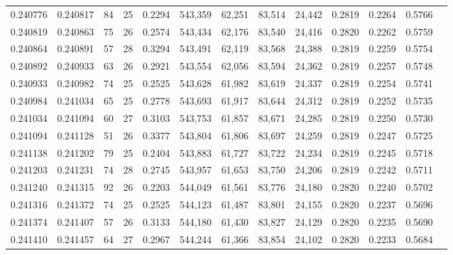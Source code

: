 \begin{tabular}{rrrrrrrrrrrrr}
0.240776 & 0.240817 &  84 &  25 &                                     0.2294 & 543,359 &  62,251 &  83,514 &  24,442 & 0.2819 & 0.2264 & 0.5766 \\
0.240819 & 0.240863 &  75 &  26 &                                     0.2574 & 543,434 &  62,176 &  83,540 &  24,416 & 0.2820 & 0.2262 & 0.5759 \\
0.240864 & 0.240891 &  57 &  28 &                                     0.3294 & 543,491 &  62,119 &  83,568 &  24,388 & 0.2819 & 0.2259 & 0.5754 \\
0.240892 & 0.240933 &  63 &  26 &                                     0.2921 & 543,554 &  62,056 &  83,594 &  24,362 & 0.2819 & 0.2257 & 0.5748 \\
0.240933 & 0.240982 &  74 &  25 &                                     0.2525 & 543,628 &  61,982 &  83,619 &  24,337 & 0.2819 & 0.2254 & 0.5741 \\
0.240984 & 0.241034 &  65 &  25 &                                     0.2778 & 543,693 &  61,917 &  83,644 &  24,312 & 0.2819 & 0.2252 & 0.5735 \\
0.241034 & 0.241094 &  60 &  27 &                                     0.3103 & 543,753 &  61,857 &  83,671 &  24,285 & 0.2819 & 0.2250 & 0.5730 \\
0.241094 & 0.241128 &  51 &  26 &                                     0.3377 & 543,804 &  61,806 &  83,697 &  24,259 & 0.2819 & 0.2247 & 0.5725 \\
0.241138 & 0.241202 &  79 &  25 &                                     0.2404 & 543,883 &  61,727 &  83,722 &  24,234 & 0.2819 & 0.2245 & 0.5718 \\
0.241203 & 0.241231 &  74 &  28 &                                     0.2745 & 543,957 &  61,653 &  83,750 &  24,206 & 0.2819 & 0.2242 & 0.5711 \\
0.241240 & 0.241315 &  92 &  26 &                                     0.2203 & 544,049 &  61,561 &  83,776 &  24,180 & 0.2820 & 0.2240 & 0.5702 \\
0.241316 & 0.241372 &  74 &  25 &                                     0.2525 & 544,123 &  61,487 &  83,801 &  24,155 & 0.2820 & 0.2237 & 0.5696 \\
0.241374 & 0.241407 &  57 &  26 &                                     0.3133 & 544,180 &  61,430 &  83,827 &  24,129 & 0.2820 & 0.2235 & 0.5690 \\
0.241410 & 0.241457 &  64 &  27 &                                     0.2967 & 544,244 &  61,366 &  83,854 &  24,102 & 0.2820 & 0.2233 & 0.5684 \\

\end{tabular}

